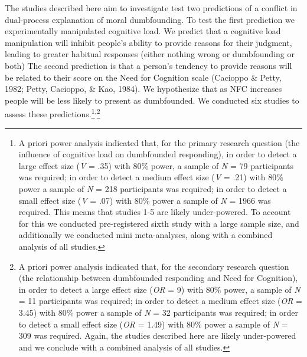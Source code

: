 \documentclass[
  american,
  man,floatsintext]{apa7}
\begin{document}
The studies described here aim to investigate test two predictions of a conflict in dual-process explanation of moral dumbfounding. To test the first prediction we experimentally manipulated cognitive load. We predict that a cognitive load manipulation will inhibit people's ability to provide reasons for their judgment, leading to greater habitual responses (either nothing wrong or dumbfounding or both) The second prediction is that a person's tendency to provide reasons will be related to their score on the Need for Cognition scale (Cacioppo \& Petty, 1982; Petty, Cacioppo, \& Kao, 1984). We hypothesize that as NFC increases people will be less likely to present as dumbfounded. We conducted six studies to assess these predictions.\footnote{A priori power analysis indicated that, for the primary research question (the influence of cognitive load on dumbfounded responding), in order to detect a large effect size (\emph{V} = .35) with 80\% power, a sample of \emph{N} = 79 participants was required; in order to detect a medium effect size (\emph{V} = .21) with 80\% power a sample of \emph{N} = 218 participants was required; in order to detect a small effect size (\emph{V} = .07) with 80\% power a sample of \emph{N} = 1966 was required. This means that studies 1-5 are likely under-powered. To account for this we conducted pre-registered sixth study with a large sample size, and additionally we conducted mini meta-analyses, along with a combined analysis of all studies.}\textsuperscript{,}\footnote{A priori power analysis indicated that, for the secondary research question (the relationship between dumbfounded responding and Need for Cognition), in order to detect a large effect size (\emph{OR} = 9) with 80\% power, a sample of \emph{N} = 11 participants was required; in order to detect a medium effect size (\emph{OR} = 3.45) with 80\% power a sample of \emph{N} = 32 participants was required; in order to detect a small effect size (\emph{OR} = 1.49) with 80\% power a sample of \emph{N} = 309 was required. Again, the studies described here are likely under-powered and we conclude with a combined analysis of all studies.}
\end{document}

